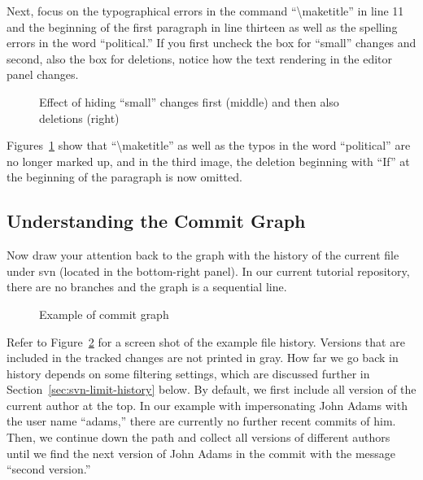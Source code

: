 Next, focus on the typographical errors in the command ``\textbackslash maketitle'' in line 11 and the beginning of the first paragraph in line thirteen as well as the spelling errors in the word ``political.''  If you first uncheck the box for ``small'' changes and second, also the box for deletions, notice how the text rendering in the editor panel changes.
\begin{figure}[t]
  \centering
  \hspace{2em}
  \hspace{2em}
\caption[Effect of hiding ``small'' changes and deletions]{Effect of hiding ``small'' changes first (middle) and then also deletions (right)} \label{fig:svn-editor-filter-small}
\end{figure}
Figures~\ref{fig:svn-editor-filter-small} show that ``\textbackslash maketitle'' as well as the typos in the word ``political'' are no longer marked up, and in the third image, the deletion beginning with ``If'' at the beginning of the paragraph is now omitted.

\subsection{Understanding the Commit Graph}

Now draw your attention back to the graph with the history of the current file under svn (located in the bottom-right panel).  In our current tutorial repository, there are no branches and the graph is a sequential line.  
\begin{figure}[t]
\centering
{}
\caption{Example of commit graph} \label{fig:svn-commit-graph}
\end{figure}
Refer to Figure~\ref{fig:svn-commit-graph} for a screen shot of the example file history. Versions that are included in the tracked changes are not printed in gray.  How far we go back in history depends on some filtering settings, which are discussed further in Section~\ref{sec:svn-limit-history} below.  By default, we first include all version of the current author at the top.  In our example with impersonating John Adams with the user name ``adams,'' there are currently no further recent commits of him.  Then, we continue down the path and collect all versions of different authors until we find the next version of John Adams in the commit with the message ``second version.''

